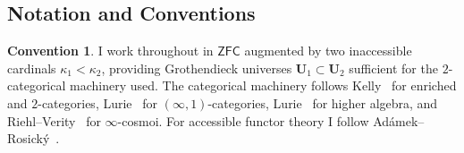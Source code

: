 \documentclass[11pt]{article}
\theoremstyle{plain}
\theoremstyle{definition}
\newtheorem{convention}[theorem]{Convention}
\newcommand{\ZFC}{\mathsf{ZFC}}
\begin{document}
\subsection{Notation and Conventions}

\begin{convention}\label{conv:zfc-inacc}
I work throughout in $\ZFC$ augmented by two inaccessible cardinals $\kappa_1 < \kappa_2$, providing Grothendieck universes $\mathbf{U}_1 \subset \mathbf{U}_2$ sufficient for the $2$-categorical machinery used. The categorical machinery follows Kelly~\cite{Kelly1982} for enriched and $2$-categories, Lurie~\cite{LurieHTT} for $(\infty, 1)$-categories, Lurie~\cite{LurieHA} for higher algebra, and Riehl--Verity~\cite{RiehlVerity2022} for $\infty$-cosmoi. For accessible functor theory I follow Ad\'amek--Rosick\'y~\cite{AdamekRosicky1994}.
\end{convention}
\end{document}
